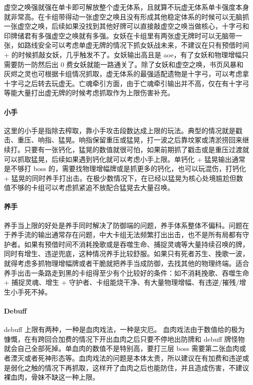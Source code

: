 ﻿\documentclass[12pt, a4paper]{article}
\begin{document}
虚空之唤强就强在单卡即可解放整个虚无体系，且就算不玩虚无体系单卡强度本身就非常高。在卡组带得动一张虚空之唤且没有形成其他稳定体系的时候可以无脑抓一张虚空之唤，后续如果没找到其他好牌可以直接敲虚空之唤当做核心，十字弓和印牌储君有多强虚空之唤就有多强。女妖在卡组里有两张虚无牌时可以无脑带一张，如路线安全可以考虑单虚无牌的情况下抓女妖战未来，不建议在只有预借时间+ 的时候抓敲女妖，几乎触发不了。女妖输出高且是 aoe，有了女妖和物理增幅只需要防一防然后出 0 费女妖就能一路通关了。除了女妖和虚空之唤，书页风暴和灰烬之灵也可根据卡组情况抓取，虚无体系的最强适配遗物是十字弓，可以考虑拿十字弓之后转去玩虚无。亡魂牵引方面，由于亡魂牵引输出并不高，仅在有十字弓等能大量打出虚无牌的时候考虑抓取作为上限伤害补充。

\paragraph{小手}
这里的小手是指除去榨取，靠小手攻击段数达成上限的玩法。典型的情况就是戳击、重压、响指、猛晃。响指保留重压或猛晃，打一波之后靠坟冢或清淤捞回来继续打。只要有一张钙化，猛晃的数值就很可怕，如果前期抓了戳击或是重压过渡就可以抓取猛晃，后续如果遇到钙化就可以考虑小手上限。单钙化 + 猛晃输出通常是不够打 boss 的，需要找物理增幅牌或是抓更多的钙化，也可以玩混伤，打钙化 + 猛晃的同时养手打出击。在极少数情况下，在已经以猛晃为核心处境尴尬但数值不够的卡组可以考虑抓紧追不放配合猛晃去大量召唤。

\paragraph{养手}
养手当上限的好处是养手同时解决了防御端的问题，养手体系整体不偏科。问题在于养手流的输出通常存在问题，中大卡组无法频繁打出出击，也不是所有局都有守护者。如果有预借时间不消耗挽歌或是吞噬生命、捕捉灵魂等大量持续召唤的牌，同时有增生、违逆兜底，这种情况养手比较舒服。如果只有死者苏生、挽歌一波，就得考虑多抓物理增幅牌或者干脆就把养手当成防御，去找其他的物理终端。适合养手出击一条路走到黑的卡组得至少有个比较好的条件：如不消耗挽歌、吞噬生命 + 捕捉灵魂、增生 + 守护者、卡组能烧干净、有大量物理增幅、有违逆/摧残/增生小手死不掉。

\paragraph{Debuff}
debuff 上限有两种，一种是血肉戏法，一种是灾厄。
血肉戏法由于数值给的极为慷慨，在有跨回合加费的情况下开出血肉之后只要不停地出防牌和 debuff 牌怪物就会自己全部死掉。单血肉的数值不是特别高，要打三层 boss 需要第二张血肉或者湮灭或者死神形态等。血肉戏法的问题是本体太贵，所以建议在有加费和违逆或是弱化之触的情况下再抓取，这样开了血肉之后也能防住，并且造成伤害，不建议裸血肉，骨妹不缺这一种上限。
\end{document}
